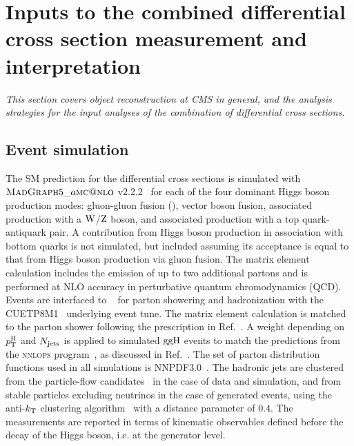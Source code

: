 \section{Inputs to the combined differential cross section measurement and interpretation}
\label{sec:inputs}

\emph{%
This section covers object reconstruction at CMS in general, and the analysis strategies for the input analyses of the combination of differential cross sections.
% 
}

\subsection{Event simulation}

 The SM prediction for the differential cross sections is simulated with $\textsc{MadGraph}{}5\_a\textsc{mc@nlo}$ v2.2.2~\cite{Alwall:2014hca} for each of the four dominant Higgs boson production modes: gluon-gluon fusion (\ggh), vector boson fusion, associated production with a $\mathrm{W}$/$\mathrm{Z}$ boson, and associated production with a top quark-antiquark pair.
% 
A contribution from Higgs boson production in association with bottom quarks is not simulated, but included assuming its acceptance is equal to that from Higgs boson production via gluon fusion.
% 
The matrix element calculation includes the emission of up to two additional partons and is performed at NLO accuracy in perturbative quantum chromodynamics (QCD).
% 
Events are interfaced to ~\cite{Sjostrand:2014zea} for parton showering and hadronization with the CUETP8M1~\cite{Skands:1695787} underlying event tune.
% 
The matrix element calculation is matched to the parton shower following the prescription in Ref.~\cite{Frederix:2012ps}.
% 
A weight depending on $p_\mathrm{T}^\mathrm{H}$ and $N_\text{jets} $ is applied to simulated $\mathrm{g}\mathrm{g}\mathrm{H}$ events to match the predictions from the {\textsc{nnlops}} program~\cite{Hamilton:2012np, Kardos:2014dua}, as discussed in Ref.~\cite{Sirunyan:2018koj}.
% 
The set of parton distribution functions used in all simulations is NNPDF3.0~\cite{Ball:2014uwa}.
%
The hadronic jets are clustered from the particle-flow candidates~\cite{Sirunyan:2017ulk} in the case of data and simulation, and from stable particles excluding neutrinos in the case of generated events, using the anti-$k_\mathrm{T}$ clustering algorithm~\cite{Cacciari:2008gp} with a distance parameter of $0.4$.
%
The measurements are reported in terms of kinematic observables defined before the decay of the Higgs boson, i.e. at the generator level.


